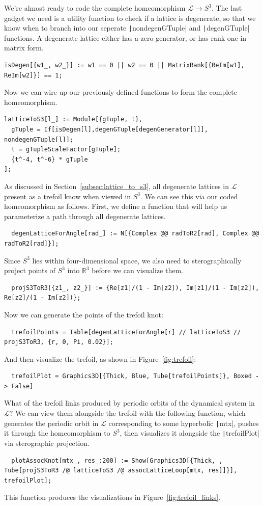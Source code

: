 \documentclass[12pt,twoside]{reedthesis}
\theoremstyle{definition}
\newcommand{\R}{\mathbb{R}}
\newcommand{\LS}{\mathcal{L}}
\begin{document}
We're almost ready to code the complete homeomorphism $\LS \to S^3$.
The last gadget we need is a utility function to check if a lattice is degenerate, so that we know when to branch into our seperate \texttt|nondegenGTuple| and \texttt|degenGTuple| functions.
A degenerate lattice either has a zero generator, or has rank one in matrix form.
\begin{verbatim}
isDegen[{w1_, w2_}] := w1 == 0 || w2 == 0 || MatrixRank[{ReIm[w1], ReIm[w2]}] == 1;
\end{verbatim}
Now we can wire up our previously defined functions to form the complete homeomorphism.
\begin{verbatim}
latticeToS3[l_] := Module[{gTuple, t},
  gTuple = If[isDegen[l],degenGTuple[degenGenerator[l]], nondegenGTuple[l]]; 
  t = gTupleScaleFactor[gTuple];
  {t^-4, t^-6} * gTuple
];
\end{verbatim}
As discussed in Section~\ref{subsec:lattice_to_s3}, all degenerate lattices in $\LS$ present as a trefoil know when viewed in $S^3$.
We can see this via our coded homeomorphism as follows.
First, we define a function that will help us parameterize a path through all degenerate lattices.
\begin{verbatim}
  degenLatticeForAngle[rad_] := N[{Complex @@ radToR2[rad], Complex @@ radToR2[rad]}];
\end{verbatim}
Since $S^3$ lies within four-dimensional space, we also need to sterographically project points of $S^3$ into $\R^3$ before we can visualize them.
\begin{verbatim}
  projS3ToR3[{z1_, z2_}] := {Re[z1]/(1 - Im[z2]), Im[z1]/(1 - Im[z2]), Re[z2]/(1 - Im[z2])};
\end{verbatim}
Now we can generate the points of the trefoil knot:
\begin{verbatim}
  trefoilPoints = Table[degenLatticeForAngle[r] // latticeToS3 // projS3ToR3, {r, 0, Pi, 0.02}];
\end{verbatim}
And then visualize the trefoil, as shown in Figure~\ref{fig:trefoil}:
\begin{verbatim}
  trefoilPlot = Graphics3D[{Thick, Blue, Tube[trefoilPoints]}, Boxed -> False]
\end{verbatim}

What of the trefoil links produced by periodic orbits of the dynamical system in $\LS$?
We can view them alongside the trefoil with the following function, which generates the periodic orbit in $\LS$ corresponding to some hyperbolic \texttt|mtx|, pushes it through the homeomorphism to $S^3$, then visualizes it alongside the \texttt|trefoilPlot| via sterographic projection.
\begin{verbatim}
  plotAssocKnot[mtx_, res_:200] := Show[Graphics3D[{Thick, , Tube[projS3ToR3 /@ latticeToS3 /@ assocLatticeLoop[mtx, res]]}], trefoilPlot];
\end{verbatim}
This function produces the visualizations in Figure~\ref{fig:trefoil_links}.
\end{document}
